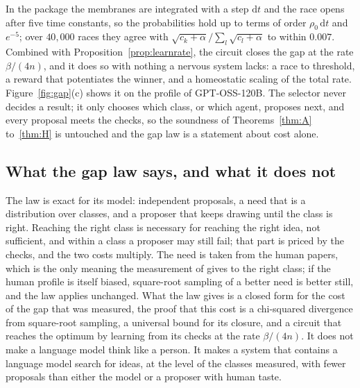 In the package the membranes are integrated with a step $\mathrm{d}t$ and the race opens after five time constants, so the probabilities hold up to terms of order $\rho_{0}\,\mathrm{d}t$ and $e^{-5}$; over $40{,}000$ races they agree with $\sqrt{c_{k}+\alpha}/\sum_{l}\sqrt{c_{l}+\alpha}$ to within $0.007$. Combined with Proposition~\ref{prop:learnrate}, the circuit closes the gap at the rate $\beta/(4n)$, and it does so with nothing a nervous system lacks: a race to threshold, a reward that potentiates the winner, and a homeostatic scaling of the total rate. Figure~\ref{fig:gap}(c) shows it on the profile of GPT-OSS-120B. The selector never decides a result; it only chooses which class, or which agent, proposes next, and every proposal meets the checks, so the soundness of Theorems~\ref{thm:A} to~\ref{thm:H} is untouched and the gap law is a statement about cost alone.

\subsection{What the gap law says, and what it does not}

The law is exact for its model: independent proposals, a need that is a distribution over classes, and a proposer that keeps drawing until the class is right. Reaching the right class is necessary for reaching the right idea, not sufficient, and within a class a proposer may still fail; that part is priced by the checks, and the two costs multiply. The need is taken from the human papers, which is the only meaning the measurement of \cite{CZC26} gives to the right class; if the human profile is itself biased, square-root sampling of a better need is better still, and the law applies unchanged. What the law gives is a closed form for the cost of the gap that was measured, the proof that this cost is a chi-squared divergence from square-root sampling, a universal bound for its closure, and a circuit that reaches the optimum by learning from its checks at the rate $\beta/(4n)$. It does not make a language model think like a person. It makes a system that contains a language model search for ideas, at the level of the classes measured, with fewer proposals than either the model or a proposer with human taste.
